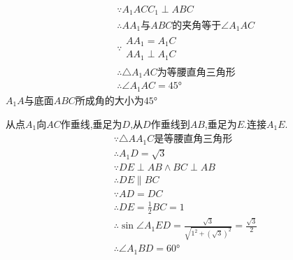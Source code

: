 \begin{questions}
\begin{figure*}[ht]
	\end{figure*}

	\begin{solution}
		\begin{penum}
			\item
			\begin{align*}
				 & \because A_1ACC_1 \perp ABC                         \\
				 & \therefore AA_1\text{与}ABC\text{的夹角等于}\angle{A_1AC} \\
				 & \because
				\begin{array}{l}
					AA_1 = A_1C \\
					AA_1 \perp A_1C
				\end{array}                                        \\
				 & \therefore \triangle{A_1AC}\text{为等腰直角三角形}          \\
				 & \therefore \angle{A_1AC} = \ang{45}
			\end{align*}
			$A_1A$与底面$ABC$所成角的大小为$\ang{45}$
			\item 从点$A_1$向$AC$作垂线,垂足为$D$,从$D$作垂线到$AB$,垂足为$E$.连接$A_1E$.
			\begin{align*}
				 & \because \triangle{AA_1C}\text{是等腰直角三角形}                                                       \\
				 & \therefore A_1D = \sqrt{3}                                                                     \\
				 & \because DE \perp AB \land BC \perp AB                                                         \\
				 & \therefore DE \parallel BC                                                                     \\
				 & \because AD = DC                                                                               \\
				 & \therefore DE = \frac12BC = 1                                                                  \\
				 & \therefore \sin\angle{A_1ED} = \frac{\sqrt{3}}{\sqrt{1^2 + (\sqrt{3})^2}} = \frac{\sqrt{3}}{2} \\
				 & \therefore \angle{A_1BD} = \ang{60}

\end{align*}
\end{penum}
\end{solution}
\end{questions}
